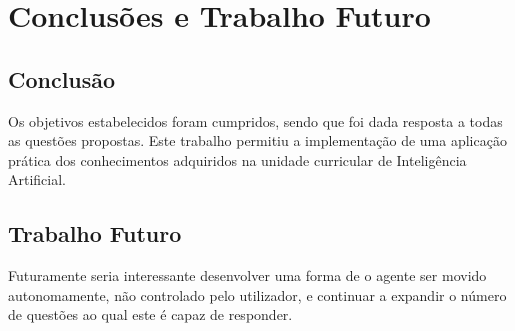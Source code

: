\section{Conclusões e Trabalho Futuro}
\label{chap:conc-trab-futuro}

\subsection{Conclusão}
\label{sec:conc-princ}

Os objetivos estabelecidos foram cumpridos, sendo que foi dada resposta a todas as questões propostas. Este trabalho permitiu a implementação de uma aplicação prática dos conhecimentos adquiridos na unidade curricular de Inteligência Artificial.

\subsection{Trabalho Futuro}
\label{sec:trab-futuro}

Futuramente seria interessante desenvolver uma forma de o agente ser movido autonomamente, não controlado pelo utilizador, e continuar a expandir o número de questões ao qual este é capaz de responder.

